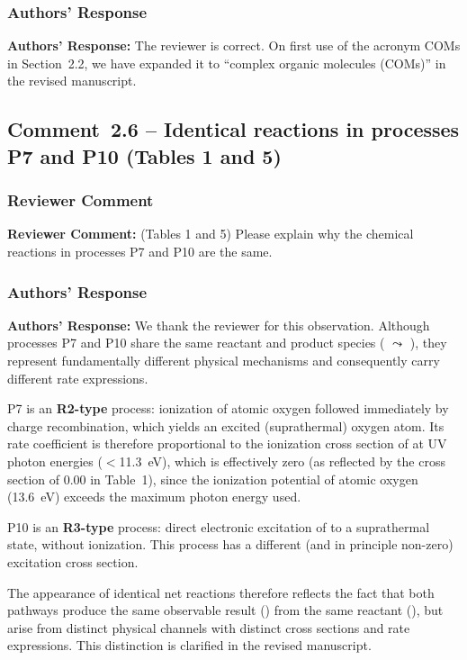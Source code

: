 \documentclass[12pt]{article}
\newcommand{\reviewlabel}{\textbf{\textcolor{commentframe}{Reviewer Comment:}}}
\newcommand{\responselabel}{\textbf{\textcolor{responseframe}{Authors' Response:}}}
\begin{document}
\subsubsection{Authors' Response}
\begin{responsebox}
\responselabel{} The reviewer is correct. On first use of the acronym COMs in
Section~2.2, we have expanded it to ``complex organic molecules (COMs)'' in
the revised manuscript.
\end{responsebox}

\subsection{Comment~2.6 -- Identical reactions in processes P7 and P10 (Tables 1 and 5)}

\subsubsection{Reviewer Comment}
\begin{reviewerbox}
\reviewlabel{} (Tables 1 and 5) Please explain why the chemical reactions in
processes P7 and P10 are the same.
\end{reviewerbox}

\subsubsection{Authors' Response}
\begin{responsebox}
\responselabel{} We thank the reviewer for this observation. Although
processes P7 and P10 share the same reactant and product species
( $\leadsto$ ), they represent fundamentally different physical
mechanisms and consequently carry different rate expressions.

P7 is an \textbf{R2-type} process: ionization of atomic oxygen followed
immediately by charge recombination, which yields an excited (suprathermal)
oxygen atom. Its rate coefficient is therefore proportional to the ionization
cross section of  at UV photon energies ($<$11.3~eV), which is
effectively zero (as reflected by the cross section of 0.00 in Table~1),
since the ionization potential of atomic oxygen (13.6~eV) exceeds the
maximum photon energy used.

P10 is an \textbf{R3-type} process: direct electronic excitation of 
to a suprathermal state, without ionization. This process has a different
(and in principle non-zero) excitation cross section.

The appearance of identical net reactions therefore reflects the fact that
both pathways produce the same observable result () from the same
reactant (), but arise from distinct physical channels with distinct
cross sections and rate expressions. This distinction is clarified in the
revised manuscript.
\end{responsebox}
\end{document}

